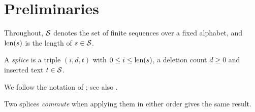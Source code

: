 \section{Preliminaries}\label{sec:prelim}

Throughout, $\mathcal{S}$ denotes the set of finite sequences over a fixed alphabet,
and $\operatorname{len}(s)$ is the length of $s \in \mathcal{S}$.

\begin{definition}\label{def:splice}
A \emph{splice} is a triple $(i, d, t)$ with $0 \le i \le \operatorname{len}(s)$, a deletion
count $d \ge 0$ and inserted text $t \in \mathcal{S}$.
\end{definition}

We follow the notation of \textcite{shapiro2011}; see also \cite[Section~2]{shapiro2011}.

Two splices \emph{commute} when applying them in either order gives the same result.
